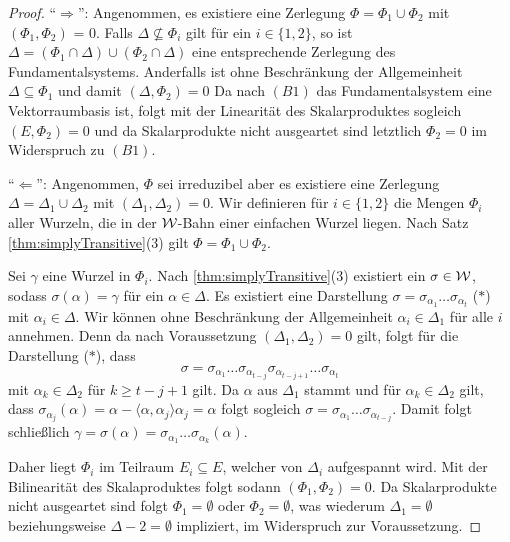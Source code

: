 \begin{proof}
  ``$\Rightarrow$'':
  Angenommen, es existiere eine Zerlegung $\Phi = \Phi_1 \cup \Phi_2$ mit $(\Phi_1, \Phi_2)$ = 0.
  Falls $\Delta \not\subseteq \Phi_i$ gilt für ein $i \in \{1,2\}$, so ist $\Delta = (\Phi_1 \cap \Delta) \cup (\Phi_2 \cap \Delta)$ eine entsprechende Zerlegung des Fundamentalsystems.
  Anderfalls ist ohne Beschränkung der Allgemeinheit $\Delta \subseteq \Phi_1$ und damit $(\Delta, \Phi_2) = 0$
  Da nach $(B1)$ das Fundamentalsystem eine Vektorraumbasis ist, folgt mit der Linearität des Skalarproduktes sogleich $(E, \Phi_2) = 0$ und da Skalarprodukte nicht ausgeartet sind letztlich $\Phi_2 = {0}$ im Widerspruch zu $(B1)$.

  ``$\Leftarrow$'':
  Angenommen, $\Phi$ sei irreduzibel aber es existiere eine Zerlegung $\Delta = \Delta_1 \cup \Delta_2$ mit $(\Delta_1, \Delta_2) = 0$.
  Wir definieren für $i \in \{1,2\}$ die Mengen $\Phi_i$ aller Wurzeln, die in der $\mathcal{W}$\hyp{}Bahn einer einfachen Wurzel liegen. 
  Nach Satz \ref{thm:simplyTransitive}(3) gilt $\Phi = \Phi_1 \cup \Phi_2$.

  Sei $\gamma$ eine Wurzel in $\Phi_i$.
  Nach \ref{thm:simplyTransitive}(3) existiert ein $\sigma \in \mathcal{W}$, sodass $\sigma(\alpha) = \gamma$ für ein $\alpha \in \Delta$.
  Es existiert eine Darstellung $\sigma = \sigma_{\alpha_1} \dots \sigma_{\alpha_t}$ ($\ast$) mit $\alpha_i \in \Delta$.
  Wir können ohne Beschränkung der Allgemeinheit $\alpha_i \in \Delta_1$ für alle $i$ annehmen.
  Denn da nach Voraussetzung $(\Delta_1, \Delta_2) = 0$ gilt, folgt für die Darstellung ($\ast$), dass
  \begin{displaymath}
    \sigma = \sigma_{\alpha_1} \dots \sigma_{\alpha_{t-j}} \sigma_{\alpha_{t-j+1}} \dots \sigma_{\alpha_t}
  \end{displaymath}
  mit $\alpha_k \in \Delta_2$ für $k \geq t-j+1$ gilt.
  Da $\alpha$ aus $\Delta_1$ stammt und für $\alpha_k \in \Delta_2$ gilt, dass $\sigma_{\alpha_j}(\alpha) = \alpha - \langle \alpha, \alpha_j \rangle \alpha_j = \alpha$ folgt sogleich $\sigma = \sigma_{\alpha_1} \dots \sigma_{\alpha_{t - j}}$. 
  Damit folgt schließlich
  $\gamma = \sigma(\alpha) = \sigma_{\alpha_1} \dots \sigma_{\alpha_k}(\alpha)$.

  Daher liegt $\Phi_i$ im Teilraum $E_i \subseteq E$, welcher von $\Delta_i$ aufgespannt wird.
  Mit der Bilinearität des Skalaproduktes folgt sodann $(\Phi_1, \Phi_2) = 0$.
  Da Skalarprodukte nicht ausgeartet sind folgt $\Phi_1 = \emptyset$ oder $\Phi_2 = \emptyset$, was wiederum $\Delta_1 = \emptyset$ beziehungsweise $\Delta-2 = \emptyset$ impliziert, im Widerspruch zur Voraussetzung.
\end{proof}
